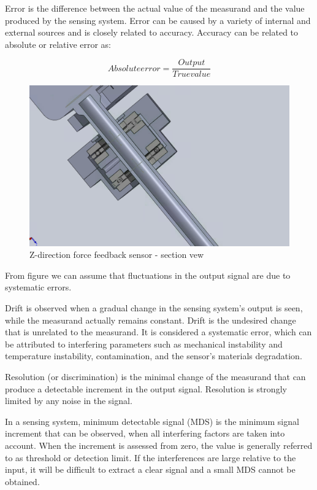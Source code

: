 Error is the difference between the actual value of the measurand and the value produced by the sensing system. Error can be caused by a variety of internal and external sources and is closely related to accuracy. Accuracy can be related to absolute or relative error as:

\begin{equation}
Absolute error = \frac{Output}{ True value}
\end{equation}

\begin{figure}
	\begin{center}
		\includegraphics[width=120mm]{fig/methods/z_dir_sec.png}
	\end{center}
	\vspace{-4mm}
	\caption[Z-direction force feedback sensor - section vew]
	{Z-direction force feedback sensor - section vew}
	\label{fig:Z-direction_sec}
	\vspace{-2mm}
\end{figure}

From figure we can assume that fluctuations in the output signal are due to systematic errors. 

Drift is observed when a gradual change in the sensing system’s output is seen, while the measurand actually remains constant. Drift is the undesired change that is unrelated to the measurand. It is considered a systematic error, which can be attributed to interfering parameters such as mechanical instability and temperature instability, contamination, and the sensor’s materials degradation. 

Resolution (or discrimination) is the minimal change of the measurand that can produce a detectable increment in the output signal. Resolution is strongly limited by any noise in the signal.

In a sensing system, minimum detectable signal (MDS) is the minimum signal increment that can be observed, when all interfering factors are taken into account. When the increment is assessed from zero, the value is generally referred to as threshold or detection limit. If the interferences are large relative to the input, it will be difficult to extract a clear signal and a small MDS cannot be obtained.

